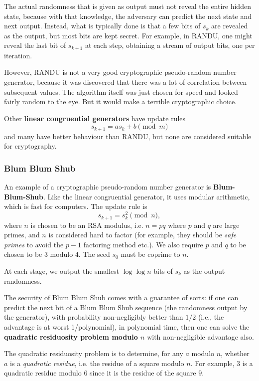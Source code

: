 \documentclass{article}
\theoremstyle{plain}
\theoremstyle{definition}
\theoremstyle{remark}
\numberwithin{theorem}{section}
\begin{document}
The actual randomness that is given as output must not reveal the entire hidden state, because with that knowledge, the adversary can predict the next state and next output.  Instead, what is typically done is that a few bits of $s_k$ are revealed as the output, but most bits are kept secret.  For example, in RANDU, one might reveal the last bit of $s_{k+1}$ at each step, obtaining a stream of output bits, one per iteration.

However, RANDU is not a very good cryptographic pseudo-random number generator, because it was discovered that there was a lot of correlation between subsequent values.  The algorithm itself was just chosen for speed and looked fairly random to the eye.  But it would make a terrible cryptographic choice.

Other \textbf{linear congruential generators} have update rules
\[
s_{k+1} = a s_k + b \pmod {m}
\]
and many have better behaviour than RANDU, but none are considered suitable for cryptography.

\subsubsection{Blum Blum Shub}

An example of a cryptographic pseudo-random number generator is \textbf{Blum-Blum-Shub}.  Like the linear congruential generator, it uses modular arithmetic, which is fast for computers.  The update rule is
\[
s_{k+1} = s_k^2 \pmod{n},
\]
where $n$ is chosen to be an RSA modulus, i.e. $n=pq$ where $p$ and $q$ are large primes, and $n$ is considered hard to factor (for example, they should be \emph{safe primes} to avoid the $p-1$ factoring method etc.).  We also require $p$ and $q$ to be chosen to be $3$ modulo $4$.  The seed $s_0$ must be coprime to $n$.

At each stage, we output the smallest $\log \log n$ bits of $s_k$ as the output randomness.

The security of Blum Blum Shub comes with a guarantee of sorts:  if one can predict the next bit of a Blum Blum Shub sequence (the randomness output by the generator), with probability non-negligibly better than $1/2$ (i.e., the advantage is at worst 1/polynomial), in polynomial time, then one can solve the \textbf{quadratic residuosity problem modulo $n$} with non-negligible advantage also.

The quadratic residuosity problem is to determine, for any $a$ modulo $n$, whether $a$ is a \emph{quadratic residue}, i.e. the residue of a square modulo $n$.  For example, $3$ is a quadratic residue modulo $6$ since it is the residue of the square $9$.
\end{document}

